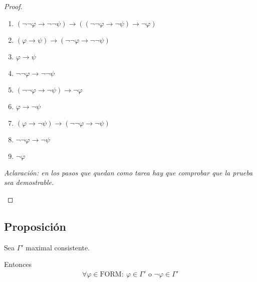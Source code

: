 \begin{proof}
\begin{enumerate}
\begin{itemize}
                    \begin{enumerate}
                        \item $(\neg\neg\varphi\to\neg\neg\psi)\to
                            ((\neg\neg\varphi\to\neg\psi)\to\neg\varphi)$
                        \item $(\varphi\to\psi)\to
                            (\neg\neg\varphi\to\neg\neg\psi)$
                        \item $\varphi\to\psi$
                        \item $\neg\neg\varphi \to \neg\neg \psi$
                        \item $(\neg\neg\varphi\to\neg\psi)\to\neg\varphi$
                        \item $\varphi\to\neg\psi$
                        \item $(\varphi\to\neg\psi)\to
                            (\neg\neg\varphi\to\neg\psi)$
                        \item $\neg\neg\varphi\to\neg\psi$
                        \item $\neg\varphi$
                    \end{enumerate}

                    \medskip
                    \textit{Aclaración: en los pasos que quedan como tarea
                        hay que comprobar que la prueba sea demostrable.}
            \end{itemize}
    \end{enumerate}
\end{proof}

\subsection{Proposición}

\begin{proposicion}{}{}
    Sea $\Gamma'$ maximal consistente.

    \medskip

    Entonces 
    \begin{gather*}
        \forall \varphi \in \mathrm{FORM}: ~
        \varphi \in \Gamma' \text{ o } \neg \varphi \in \Gamma'
    \end{gather*}    
\end{proposicion}

